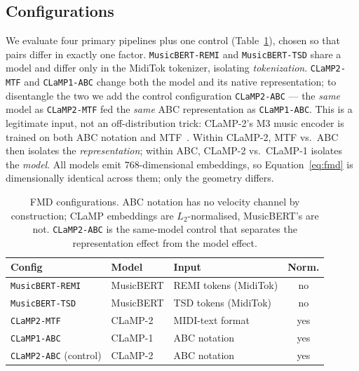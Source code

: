 \documentclass[11pt]{article}
\begin{document}
\subsection{Configurations}
We evaluate four primary pipelines plus one control
(Table~\ref{tab:configs}), chosen so that pairs differ in exactly one
factor. \texttt{MusicBERT-REMI} and \texttt{MusicBERT-TSD} share a model
and differ only in the MidiTok tokenizer, isolating \emph{tokenization}.
\texttt{CLaMP2-MTF} and \texttt{CLaMP1-ABC} change both the model and its
native representation; to disentangle the two we add the control
configuration \texttt{CLaMP2-ABC} --- the \emph{same} model as
\texttt{CLaMP2-MTF} fed the \emph{same} ABC representation as
\texttt{CLaMP1-ABC}. This is a legitimate input, not an off-distribution
trick: CLaMP-2's M3 music encoder is trained on both ABC notation and
MTF~\cite{wu2024clamp2}. Within CLaMP-2, MTF vs.\ ABC then isolates the
\emph{representation}; within ABC, CLaMP-2 vs.\ CLaMP-1 isolates the
\emph{model}. All models emit $768$-dimensional embeddings, so
Equation~\eqref{eq:fmd} is dimensionally identical across them; only the
geometry differs.

\begin{table}[t]
\centering
\caption{FMD configurations. ABC notation has no velocity channel by
construction; CLaMP embeddings are $L_2$-normalised, MusicBERT's are not.
\texttt{CLaMP2-ABC} is the same-model control that separates the
representation effect from the model effect.}
\label{tab:configs}
\small
\begin{tabular}{@{}lllc@{}}
\toprule
Config & Model & Input & Norm. \\
\midrule
\texttt{MusicBERT-REMI} & MusicBERT & REMI tokens (MidiTok) & no \\
\texttt{MusicBERT-TSD}  & MusicBERT & TSD tokens (MidiTok)  & no \\
\texttt{CLaMP2-MTF}     & CLaMP-2   & MIDI-text format      & yes \\
\texttt{CLaMP1-ABC}     & CLaMP-1   & ABC notation          & yes \\
\texttt{CLaMP2-ABC} (control) & CLaMP-2 & ABC notation      & yes \\
\bottomrule
\end{tabular}
\end{table}
\end{document}
